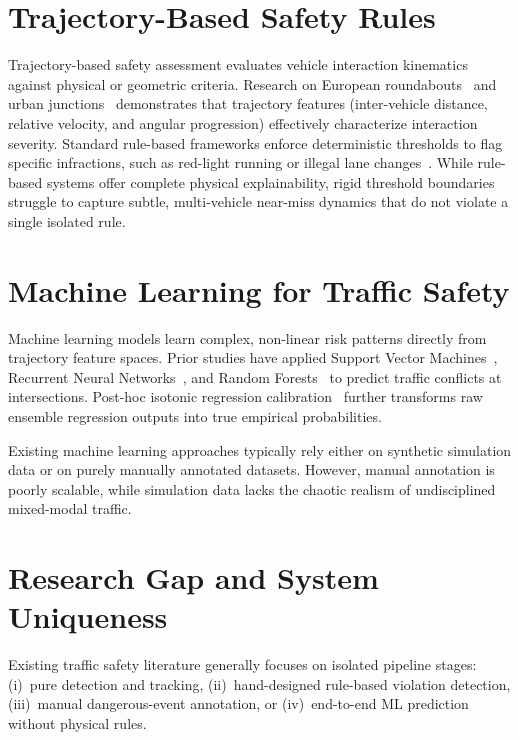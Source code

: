 \documentclass[12pt,a4paper]{report}
\begin{document}
\section{Trajectory-Based Safety Rules}

Trajectory-based safety assessment evaluates vehicle interaction kinematics against physical or geometric criteria. Research on European roundabouts~\cite{drone_roundabout} and urban junctions~\cite{china_traffic, guennouni2023} demonstrates that trajectory features (inter-vehicle distance, relative velocity, and angular progression) effectively characterize interaction severity. Standard rule-based frameworks enforce deterministic thresholds to flag specific infractions, such as red-light running or illegal lane changes~\cite{huang2022}. While rule-based systems offer complete physical explainability, rigid threshold boundaries struggle to capture subtle, multi-vehicle near-miss dynamics that do not violate a single isolated rule.

\section{Machine Learning for Traffic Safety}

Machine learning models learn complex, non-linear risk patterns directly from trajectory feature spaces. Prior studies have applied Support Vector Machines~\cite{svm_conflict}, Recurrent Neural Networks~\cite{lstm_conflict}, and Random Forests~\cite{rf_conflict, zeng2020} to predict traffic conflicts at intersections. Post-hoc isotonic regression calibration~\cite{isotonic} further transforms raw ensemble regression outputs into true empirical probabilities. 

Existing machine learning approaches typically rely either on synthetic simulation data or on purely manually annotated datasets. However, manual annotation is poorly scalable, while simulation data lacks the chaotic realism of undisciplined mixed-modal traffic.

\section{Research Gap and System Uniqueness}

Existing traffic safety literature generally focuses on isolated pipeline stages: (i)~pure detection and tracking, (ii)~hand-designed rule-based violation detection, (iii)~manual dangerous-event annotation, or (iv)~end-to-end ML prediction without physical rules.
\end{document}
